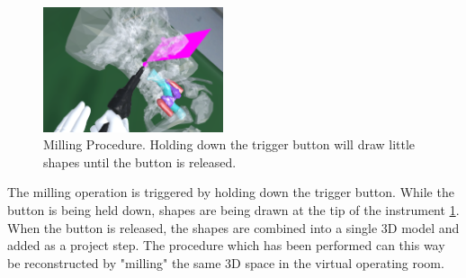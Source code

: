\begin{figure}[ht]
    \centering
    \includegraphics[width=200px]{images/implementation/features/procedures/bonesaw.png}
    \caption{\label{fig::FeaturePiezo}Milling Procedure. Holding down the trigger button will draw little shapes until the button is released.}
\end{figure}

The milling operation is triggered by holding down the trigger button.
While the button is being held down, shapes are being drawn at the tip of the instrument \ref{fig::FeaturePiezo}.
When the button is released, the shapes are combined into a single 3D model and added as a project step.
The procedure which has been performed can this way be reconstructed by "milling" the same 3D space in the virtual operating room.